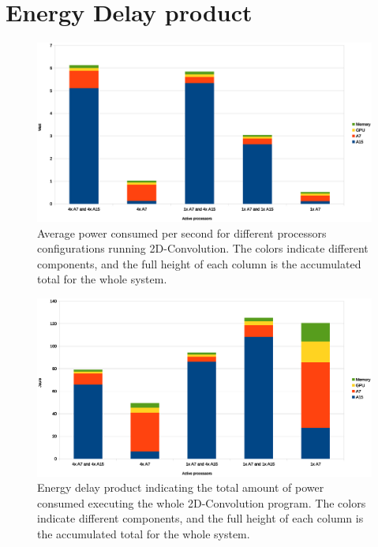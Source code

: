 \section{Energy Delay product}

\begin{figure}[H]
  \centering
  \includegraphics[width=160mm]{fig/power-configurations.eps}
  \caption{Average power consumed per second for different processors configurations running 2D-Convolution. The colors indicate different components, and the full height of each column is the accumulated total for the whole system.\label{overflow}}
\end{figure}

\begin{figure}[H]
  \centering
  \includegraphics[width=160mm]{fig/power-consumed-configurations.eps}
  \caption{Energy delay product indicating the total amount of power consumed executing the whole 2D-Convolution program. The colors indicate different components, and the full height of each column is the accumulated total for the whole system.\label{overflow}}
\end{figure}

